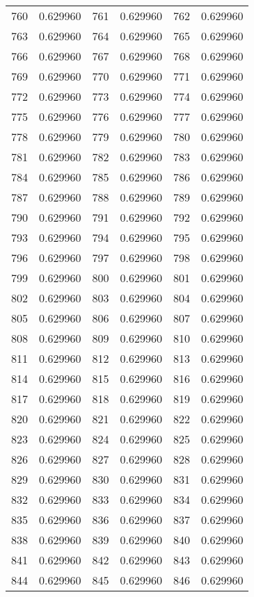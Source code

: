 \documentclass[12pt]{article}
\begin{document}
\begin{longtable}{@{}cc|cc|cc@{}}
760 & 0.629960 & 761 & 0.629960 & 762 & 0.629960 \\
763 & 0.629960 & 764 & 0.629960 & 765 & 0.629960 \\
766 & 0.629960 & 767 & 0.629960 & 768 & 0.629960 \\
769 & 0.629960 & 770 & 0.629960 & 771 & 0.629960 \\
772 & 0.629960 & 773 & 0.629960 & 774 & 0.629960 \\
775 & 0.629960 & 776 & 0.629960 & 777 & 0.629960 \\
778 & 0.629960 & 779 & 0.629960 & 780 & 0.629960 \\
781 & 0.629960 & 782 & 0.629960 & 783 & 0.629960 \\
784 & 0.629960 & 785 & 0.629960 & 786 & 0.629960 \\
787 & 0.629960 & 788 & 0.629960 & 789 & 0.629960 \\
790 & 0.629960 & 791 & 0.629960 & 792 & 0.629960 \\
793 & 0.629960 & 794 & 0.629960 & 795 & 0.629960 \\
796 & 0.629960 & 797 & 0.629960 & 798 & 0.629960 \\
799 & 0.629960 & 800 & 0.629960 & 801 & 0.629960 \\
802 & 0.629960 & 803 & 0.629960 & 804 & 0.629960 \\
805 & 0.629960 & 806 & 0.629960 & 807 & 0.629960 \\
808 & 0.629960 & 809 & 0.629960 & 810 & 0.629960 \\
811 & 0.629960 & 812 & 0.629960 & 813 & 0.629960 \\
814 & 0.629960 & 815 & 0.629960 & 816 & 0.629960 \\
817 & 0.629960 & 818 & 0.629960 & 819 & 0.629960 \\
820 & 0.629960 & 821 & 0.629960 & 822 & 0.629960 \\
823 & 0.629960 & 824 & 0.629960 & 825 & 0.629960 \\
826 & 0.629960 & 827 & 0.629960 & 828 & 0.629960 \\
829 & 0.629960 & 830 & 0.629960 & 831 & 0.629960 \\
832 & 0.629960 & 833 & 0.629960 & 834 & 0.629960 \\
835 & 0.629960 & 836 & 0.629960 & 837 & 0.629960 \\
838 & 0.629960 & 839 & 0.629960 & 840 & 0.629960 \\
841 & 0.629960 & 842 & 0.629960 & 843 & 0.629960 \\
844 & 0.629960 & 845 & 0.629960 & 846 & 0.629960 \\

\end{longtable}
\end{document}
